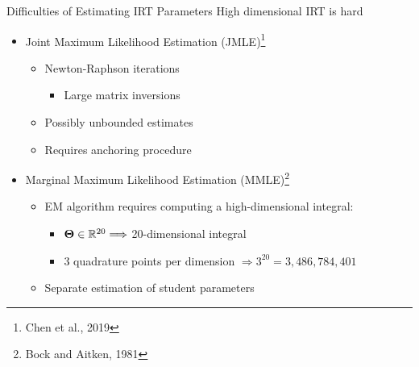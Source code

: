 \documentclass{beamer}
\def \R{\ensuremath \mathbb{R}}
\newcommand{\vect}[1]{\boldsymbol{#1}}
\theoremstyle{definition}
\begin{document}
%

\begin{frame}{Difficulties of Estimating IRT Parameters}
 High dimensional IRT is hard
  \begin{itemize}
    \item Joint Maximum Likelihood Estimation (JMLE)\footnote{Chen et al., 2019}
      \begin{itemize}
        \item Newton-Raphson iterations
          \begin{itemize}
            \item Large matrix inversions
          \end{itemize}
        \item Possibly unbounded estimates
        \item Requires anchoring procedure
      \end{itemize}
    \item<2-> Marginal Maximum Likelihood Estimation (MMLE)\footnote{Bock and Aitken, 1981}
      \begin{itemize}
        \item EM algorithm requires computing a high-dimensional integral:
        \begin{itemize}
          \item $\vect \Theta \in \R^{20} \Longrightarrow$ 20-dimensional integral
          \item 3 quadrature points per dimension $\Longrightarrow 3^{20} = 3,486,784,401$
        \end{itemize}
        \item Separate estimation of student parameters
      \end{itemize}
  \end{itemize}
\end{frame}
\end{document}
